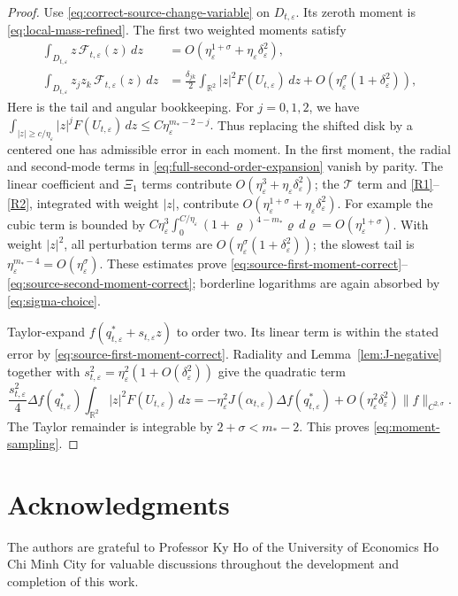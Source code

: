 \documentclass[11pt,reqno]{amsart}
\numberwithin{equation}{section}
\theoremstyle{definition}
\theoremstyle{remark}
\newcommand{\R}{\mathbb R}
\newcommand{\eps}{\varepsilon}
\newcommand{\etae}{\eta_{\eps}}
\newcommand{\de}{\delta_{\eps}}
\begin{document}
\begin{proof}
Use \eqref{eq:correct-source-change-variable} on $D_{t,\eps}$.
Its zeroth moment is \eqref{eq:local-mass-refined}. The first two
weighted moments satisfy
\begin{align}
 \int_{D_{t,\eps}} z\,\mathcal F_{t,\eps}(z)\,dz
 &=O(\etae^{1+\sigma}+\etae\de^2),
 \label{eq:source-first-moment-correct}\\
 \int_{D_{t,\eps}} z_jz_k\,\mathcal F_{t,\eps}(z)\,dz
 &=\frac{\delta_{jk}}2\int_{\R^2}|z|^2F(U_{t,\eps})\,dz
   +O(\etae^\sigma(1+\de^2)),
 \label{eq:source-second-moment-correct}
\end{align}
Here is the tail and angular bookkeeping. For $j=0,1,2$, we have 
\(
 \int_{|z|\ge c/\etae}|z|^jF(U_{t,\eps})\,dz
 \le C\etae^{m_*-2-j}.
\)
Thus replacing the shifted disk by a centered one has admissible
error in each moment. In the first moment, the radial and second-mode
terms in \eqref{eq:full-second-order-expansion} vanish by parity.
The linear coefficient and $\Xi_1$ terms contribute
$O(\etae^3+\etae\de^2)$; the $\mathcal T$ term and
\eqref{R1}--\eqref{R2}, integrated with weight $|z|$, contribute
$O(\etae^{1+\sigma}+\etae\de^2)$.
For example the cubic term is bounded by
$C\etae^3\int_0^{C/\etae}(1+\varrho)^{4-m_*}\varrho\,d\varrho
=O(\etae^{1+\sigma})$.
With weight $|z|^2$, all perturbation terms are
$O(\etae^\sigma(1+\de^2))$; the slowest tail is
$\etae^{m_*-4}=O(\etae^\sigma)$.
These estimates prove \eqref{eq:source-first-moment-correct}--
\eqref{eq:source-second-moment-correct}; borderline logarithms are
again absorbed by \eqref{eq:sigma-choice}.

Taylor-expand $f(q_{t,\eps}^*+s_{t,\eps}z)$ to order two.
Its linear term is within the stated error by
\eqref{eq:source-first-moment-correct}. Radiality and
Lemma~\ref{lem:J-negative} together with  $s_{t,\eps}^2=\etae^2(1+O(\de^2))$ give the quadratic term
\[
 \frac{s_{t,\eps}^2}{4}\Delta f(q_{t,\eps}^*)
       \int_{\R^2}|z|^2F(U_{t,\eps})\,dz
 =-\etae^2J(\alpha_{t,\eps})\Delta f(q_{t,\eps}^*)
   +O(\etae^2\de^2)\|f\|_{C^{2,\sigma}}.
\]
The Taylor remainder is integrable by
$2+\sigma<m_*-2$. This proves \eqref{eq:moment-sampling}.
\end{proof}


\section*{Acknowledgments}

The authors are grateful to Professor Ky Ho of the University of Economics
Ho Chi Minh City for valuable discussions throughout the development
and completion of this work.
\end{document}

